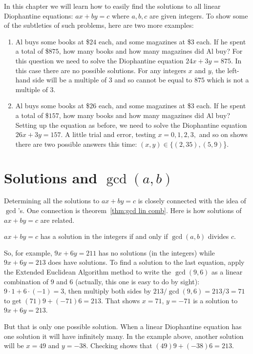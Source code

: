 In this chapter we will learn how to easily find the solutions to
all linear Diophantine equations: $ax+by = c$ where $a,b,c$ are given
integers. To show some of the subtleties of such problems, here are 
two more examples:
\begin{enumerate}
 \item Al buys some books at \$$24$ each, and some magazines at \$$3$ each. 
 If he spent 
 a total of \$$875$, how many books and how many magazines did Al buy? For
 this question we need to solve the Diophantine equation $24x+3y=875$.
 In this case there are no possible solutions. For any integers $x$ and
 $y$, the left-hand side will be a multiple of $3$ and so cannot be equal
 to $875$ which is not a multiple of $3$.
 
 
 \item  Al buys some books at \$$26$ each, and some magazines at \$$3$ each. 
 If he spent 
 a total of \$$157$, how many books and how many magazines did Al buy?
 Setting up the equation as before, we need to solve the Diophantine equation
 $26x+3y=157$. A little trial and error, testing $x=0,1,2,3,$ and so on
 shows there are two possible answers this time:
 $(x,y) \in  \{(2,35), (5,9)$\}.
\end{enumerate}



\section{Solutions and $\gcd(a,b)$}
Determining all the  solutions to $ax+by = c$ is closely connected with the idea of
$\gcd$'s. One connection is theorem~\ref{thm:gcd lin comb}. 
Here is how solutions of $ax+by=c$ are related.

\begin{thm}
$ax+by =c$ has a solution in the integers if and
only if 
$\gcd(a,b)$ divides $c$. 
\end{thm}

So, for example, $9x+6y = 211$ has no solutions (in the integers) while
$9x+ 6y = 213$ does have solutions. To find a solution to the last
equation, apply the Extended Euclidean Algorithm method to write the $\gcd(9,6)$ as a 
linear combination of $9$ and $6$ (actually, this one is easy to do
by sight): $9\cdot 1 + 6\cdot (-1) = 3$, then multiply both sides
by ${{213}/{\gcd(9,6)}}= {{213}/3} =  71$ to get
$(71)9+ (-71)6 = 213$. That shows $x=71$, $y=-71$ is a solution
to $9x+6y=213$.

But that is only one possible solution. When a linear Diophantine 
equation has one solution it will have infinitely many. In the example
above, another solution will be $x= 49$ and $y=-38$. Checking
shows that $(49)9 + (-38)6 = 213$. 


